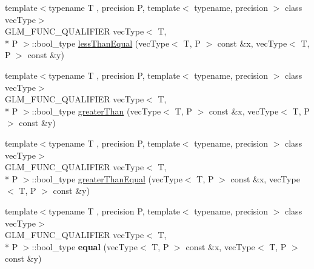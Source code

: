 \begin{DoxyCompactItemize}
\item 
{\footnotesize template$<$typename T , precision P, template$<$ typename, precision $>$ class vec\-Type$>$ }\\G\-L\-M\-\_\-\-F\-U\-N\-C\-\_\-\-Q\-U\-A\-L\-I\-F\-I\-E\-R vec\-Type$<$ T, \\*
P $>$\-::bool\-\_\-type \hyperlink{group__core__func__vector__relational_ga2167b22ac086c5791a4740932b62b685}{less\-Than\-Equal} (vec\-Type$<$ T, P $>$ const \&x, vec\-Type$<$ T, P $>$ const \&y)
\item 
{\footnotesize template$<$typename T , precision P, template$<$ typename, precision $>$ class vec\-Type$>$ }\\G\-L\-M\-\_\-\-F\-U\-N\-C\-\_\-\-Q\-U\-A\-L\-I\-F\-I\-E\-R vec\-Type$<$ T, \\*
P $>$\-::bool\-\_\-type \hyperlink{group__core__func__vector__relational_gac9163d451231eb3eaae2c6b3da5add6a}{greater\-Than} (vec\-Type$<$ T, P $>$ const \&x, vec\-Type$<$ T, P $>$ const \&y)
\item 
{\footnotesize template$<$typename T , precision P, template$<$ typename, precision $>$ class vec\-Type$>$ }\\G\-L\-M\-\_\-\-F\-U\-N\-C\-\_\-\-Q\-U\-A\-L\-I\-F\-I\-E\-R vec\-Type$<$ T, \\*
P $>$\-::bool\-\_\-type \hyperlink{group__core__func__vector__relational_gad1385064aa2fc7aaae37aa95daea9c31}{greater\-Than\-Equal} (vec\-Type$<$ T, P $>$ const \&x, vec\-Type$<$ T, P $>$ const \&y)
\item 
\hypertarget{namespaceglm_a4a4eb228ace536873b64b9690d14e971}{{\footnotesize template$<$typename T , precision P, template$<$ typename, precision $>$ class vec\-Type$>$ }\\G\-L\-M\-\_\-\-F\-U\-N\-C\-\_\-\-Q\-U\-A\-L\-I\-F\-I\-E\-R vec\-Type$<$ T, \\*
P $>$\-::bool\-\_\-type {\bfseries equal} (vec\-Type$<$ T, P $>$ const \&x, vec\-Type$<$ T, P $>$ const \&y)}\label{namespaceglm_a4a4eb228ace536873b64b9690d14e971}


\end{DoxyCompactItemize}
